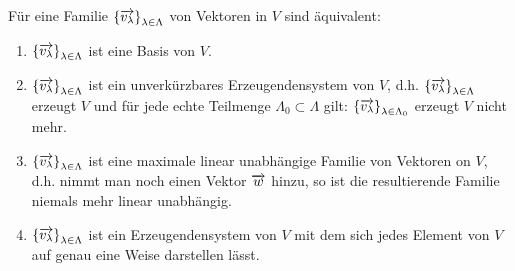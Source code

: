 \begin{satz}\label{vectorraum_basis_allgemein} 
Für eine Familie $\left\{ \overrightarrow{v_{\lambda}} \right\}_{\lambda \in \Lambda}$ von 
Vektoren in $V$ sind äquivalent:
\begin{enumerate}
\item $\left\{ \overrightarrow{v_{\lambda}} \right\}_{\lambda \in \Lambda}$ ist eine Basis von $V$.
\item $\left\{ \overrightarrow{v_{\lambda}} \right\}_{\lambda \in \Lambda}$ ist ein unverkürzbares 
Erzeugendensystem von $V$, d.h. $\left\{ \overrightarrow{v_{\lambda}} \right\}_{\lambda \in \Lambda}$ erzeugt $V$ 
und für jede echte Teilmenge $\Lambda_0 \subset \Lambda$ gilt:
$\left\{ \overrightarrow{v_{\lambda}} \right\}_{\lambda \in \Lambda_0}$ erzeugt $V$ nicht mehr.
\item $\left\{ \overrightarrow{v_{\lambda}} \right\}_{\lambda \in \Lambda}$ ist eine maximale linear unabhängige 
Familie von Vektoren on $V$, d.h. nimmt man noch einen Vektor $\overrightarrow{w}$ hinzu, so ist die 
resultierende Familie niemals mehr linear unabhängig.
\item $\left\{ \overrightarrow{v_{\lambda}} \right\}_{\lambda \in \Lambda}$ ist ein Erzeugendensystem von $V$ mit 
dem sich jedes Element von $V$ auf genau eine Weise darstellen lässt.
\end{enumerate}
\end{satz}


